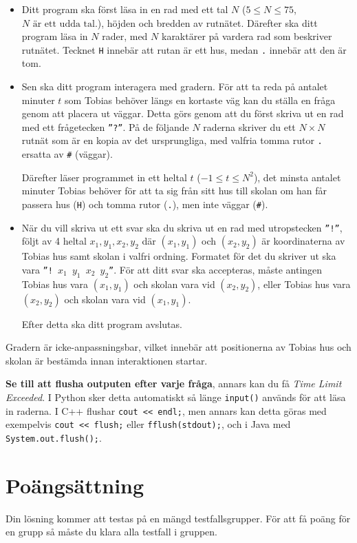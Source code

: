 \begin{itemize}
  \item Ditt program ska först läsa in en rad med ett tal $N$ ($5 \le N \le 75$, $N \text{ är ett udda tal.}$), höjden och bredden av rutnätet. 
  Därefter ska ditt program läsa in $N$ rader, med $N$ karaktärer på vardera rad som beskriver rutnätet. 
  Tecknet \texttt{H} innebär att rutan är ett hus, medan \texttt{.} innebär att den är tom.

  \item Sen ska ditt program interagera med gradern. 
  För att ta reda på antalet minuter $t$ som Tobias behöver längs en kortaste väg kan du ställa en fråga genom att placera ut väggar. 
  Detta görs genom att du först skriva ut en rad med ett frågetecken \texttt{''?''}. 
  På de följande $N$ raderna skriver du ett $N \times N$ rutnät som är en kopia av det ursprungliga, med valfria tomma rutor \texttt{.} ersatta av \texttt{\#} (väggar).

  Därefter läser programmet in ett heltal $t$ ($-1 \le t \le N^2$), det minsta antalet minuter Tobias behöver för att ta sig från sitt hus till skolan om han får passera hus (\texttt{H}) och tomma rutor (\texttt{.}), men inte väggar (\texttt{\#}).

  \item När du vill skriva ut ett svar ska du skriva ut en rad med utropstecken \texttt{''!''}, följt av 4 heltal $x_1, y_1, x_2, y_2$ där $(x_1,y_1)$ och $(x_2, y_2)$ är koordinaterna av Tobias hus samt skolan i valfri ordning.
  Formatet för det du skriver ut ska vara \texttt{''! $x_1$ $y_1$ $x_2$ $y_2$''}. 
  För att ditt svar ska accepteras, måste antingen Tobias hus vara $(x_1,y_1)$ och skolan vara vid $(x_2,y_2)$, eller Tobias hus vara $(x_2,y_2)$ och skolan vara vid $(x_1,y_1)$.

  Efter detta ska ditt program avslutas.
\end{itemize}

Gradern är icke-anpassningsbar, vilket innebär att positionerna av Tobias hus och skolan är bestämda innan interaktionen startar.


\textbf{Se till att flusha outputen efter varje fråga}, annars kan du få \textit{Time Limit Exceeded}.
I Python sker detta automatiskt så länge \texttt{input()} används för att läsa in raderna. 
I C++ flushar \texttt{cout << endl;}, men annars kan detta göras med exempelvis \texttt{cout << flush;} eller \texttt{fflush(stdout);},
och i Java med \texttt{System.out.flush();}.


\section*{Poängsättning}
Din lösning kommer att testas på en mängd testfallsgrupper.
För att få poäng för en grupp så måste du klara alla testfall i gruppen.

